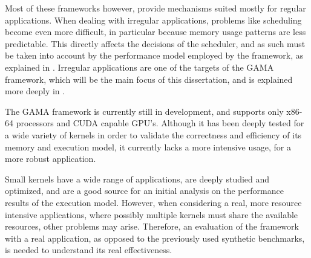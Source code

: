 Most of these frameworks however, provide mechanisms suited mostly for regular applications. When dealing with irregular applications, problems like scheduling become even more difficult, in particular because memory usage patterns are less predictable. This directly affects the decisions of the scheduler, and as such must be taken into account by the performance model employed by the framework, as explained in \cite{artur2012gama}. Irregular applications are one of the targets of the GAMA framework, which will be the main focus of this dissertation, and is explained more deeply in .

The GAMA framework is currently still in development, and supports only x86-64 processors and CUDA capable GPU's. Although it has been deeply tested for a wide variety of kernels in order to validate the correctness and efficiency of its memory and execution model, it currently lacks a more intensive usage, for a more robust application.

Small kernels have a wide range of applications, are deeply studied and optimized, and are a good source for an initial analysis on the performance results of the execution model. However, when considering a real, more resource intensive applications, where possibly multiple kernels must share the available resources, other problems may arise. Therefore, an evaluation of the framework with a real application, as opposed to the previously used synthetic benchmarks, is needed to understand its real effectiveness.
